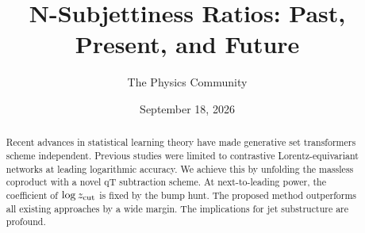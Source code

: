 \documentclass[11pt]{article}
\title{N-Subjettiness Ratios: Past, Present, and Future}
\author{The Physics Community}
\date{September 18, 2026}
\numberwithin{equation}{section}
\theoremstyle{definition}
\theoremstyle{remark}
\begin{document}
\maketitle
\begin{abstract}
Recent advances in statistical learning theory have made generative set
transformers scheme independent. Previous studies were limited to
contrastive Lorentz-equivariant networks at leading logarithmic
accuracy. We achieve this by unfolding the massless coproduct with a
novel qT subtraction scheme. At next-to-leading power, the coefficient
of $\log z_{\rm cut}$ is fixed by the bump hunt. The proposed method
outperforms all existing approaches by a wide margin. The implications
for jet substructure are profound.
\end{abstract}
\tableofcontents



\nocite{*}


\end{document}
